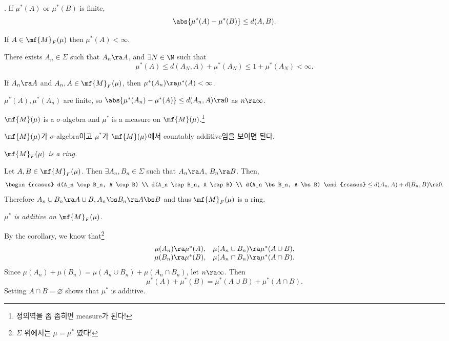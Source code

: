 \prop. If \(\mu^\ast(A)\) or \(\mu^\ast(B)\) is finite,
\[
    \abs{\mu^\ast(A) - \mu^\ast(B)} \leq d(A, B).
\]

\cor If \(A \in \mf{M}_F(\mu)\) then \(\mu^\ast(A) < \infty\).

\pf There exists \(A_n \in \Sigma\) such that \(A_n \ra A\), and \(\exists N \in \N\) such that
\[
    \mu^\ast(A) \leq d(A_N, A) + \mu^\ast(A_N) \leq 1 + \mu^\ast(A_N) < \infty.
\]

\cor If \(A_n \ra A\) and \(A_n, A \in \mf{M}_F(\mu)\), then \(\mu^\ast(A_n)\ra \mu^\ast(A) < \infty\).

\pf \(\mu^\ast(A), \mu^\ast(A_n)\) are finite, so \(\abs{\mu^\ast(A_n) - \mu^\ast(A)} \leq d(A_n, A) \ra 0\) as \(n \ra \infty\).

\bigskip

 \(\mf{M}(\mu)\) is a \(\sigma\)-algebra and \(\mu^\ast\) is a measure on \(\mf{M}(\mu)\).\footnote{정의역을 좀 좁히면 measure가 된다!}

\pf \(\mf{M}(\mu)\)가 \(\sigma\)-algebra이고 \(\mu^\ast\)가 \(\mf{M}(\mu)\)에서 countably additive임을 보이면 된다.

 \textit{\(\mf{M}_F(\mu)\) is a ring.}

Let \(A, B \in \mf{M}_F(\mu)\). Then \(\exists A_n, B_n \in \Sigma\) such that \(A_n \ra A\), \(B_n \ra B\). Then,
\[
    \begin{rcases}
        d(A_n \cup B_n, A \cup B) \\ d(A_n \cap B_n, A \cap B) \\ d(A_n \bs B_n, A \bs B)
    \end{rcases} \leq d(A_n, A) + d(B_n, B) \ra 0.
\]
Therefore \(A_n \cup B_n \ra A \cup B, A_n \bs B_n \ra A\bs B\) and thus \(\mf{M}_F(\mu)\) is a ring.

 \textit{\(\mu^\ast\) is additive on \(\mf{M}_F(\mu)\)}.

By the corollary, we know that\footnote{\(\Sigma\) 위에서는 \(\mu = \mu^\ast\) 였다!}
\[
    \begin{matrix}
        \mu(A_n) \ra \mu^\ast(A), & \mu(A_n\cup B_n) \ra \mu^\ast(A\cup B), \\
        \mu(B_n) \ra \mu^\ast(B), & \mu(A_n\cap B_n) \ra \mu^\ast(A\cap B).
    \end{matrix}
\]
Since \(\mu(A_n) + \mu(B_n) = \mu(A_n \cup B_n) + \mu(A_n \cap B_n)\), let \(n \ra \infty\). Then
\[
    \mu^\ast(A) + \mu^\ast(B) = \mu^\ast(A\cup B) + \mu^\ast(A \cap B).
\]
Setting \(A \cap B = \varnothing\) shows that \(\mu^\ast\) is additive.

